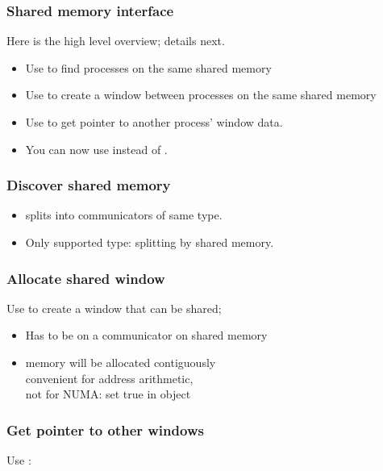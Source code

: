 \begin{frame}[containsverbatim]\frametitle{Shared memory interface}
  Here is the high level overview; details next.
  \begin{itemize}
  \item Use  to find processes on the same
    shared memory
  \item Use  to create a window between
    processes on the same shared memory
  \item Use  to get pointer to another
    process' window data.
  \item You can now use  instead of .
  \end{itemize}
\end{frame}

\begin{frame}[containsverbatim]\frametitle{Discover shared memory}
  \begin{itemize}
  \item
     splits into communicators of same type.
  \item Only supported type:  splitting by
    shared memory.
  \end{itemize}

\end{frame}

\begin{frame}[containsverbatim]\frametitle{Allocate shared window}
Use  to create a window that can
be shared;
\begin{itemize}
\item Has to be on a communicator on shared memory
\item memory will be allocated contiguously\\
  convenient for address arithmetic,\\ not for NUMA:
  set  true in
   object
\end{itemize}
\end{frame}

\begin{frame}[containsverbatim]\frametitle{Get pointer to other windows}
  Use :
\end{frame}

